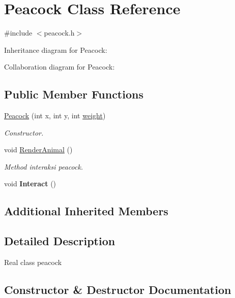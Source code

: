 \hypertarget{classPeacock}{}\section{Peacock Class Reference}
\label{classPeacock}


{\ttfamily \#include $<$peacock.\+h$>$}



Inheritance diagram for Peacock\+:


Collaboration diagram for Peacock\+:
\subsection*{Public Member Functions}
\begin{DoxyCompactItemize}
\item 
\hyperlink{classPeacock_aa79299197fb7fa9c3b916eaa85626d75}{Peacock} (int x, int y, int \hyperlink{classAnimal_a9a3b22f243f7109c57f36b3c660feb6e}{weight})
\begin{DoxyCompactList}\small\item\em Constructor. \end{DoxyCompactList}\item 
void \hyperlink{classPeacock_a9070619b1791771547404e461fb440ee}{Render\+Animal} ()\hypertarget{classPeacock_a9070619b1791771547404e461fb440ee}{}\label{classPeacock_a9070619b1791771547404e461fb440ee}

\begin{DoxyCompactList}\small\item\em Method interaksi peacock. \end{DoxyCompactList}\item 
void {\bfseries Interact} ()\hypertarget{classPeacock_a9f2592d72d115afbf75c26b75e34d776}{}\label{classPeacock_a9f2592d72d115afbf75c26b75e34d776}

\end{DoxyCompactItemize}
\subsection*{Additional Inherited Members}


\subsection{Detailed Description}
Real class peacock 

\subsection{Constructor \& Destructor Documentation}
